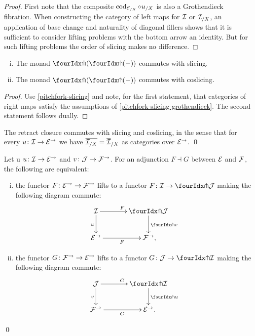 \documentclass[reqno,10pt,a4paper,oneside,draft]{amsart}
\begin{document}
{{\begin{proof}
First note that the composite $\cod_{\cal{E}_{/X}} \cc u_{/X}$ is also a Grothendieck fibration.
When constructing the category of left maps for $\cal{I}$ or $\cal{I}_{/X}$, an application of base change and naturality of diagonal fillers shows that it is sufficient to consider lifting problems with the bottom arrow an identity.
But for such lifting problems the order of slicing makes no difference.
\end{proof}



\begin{corollary} \label{pitchfork-slicing-monad}
\leavevmode
\begin{enumerate}[(i)]
\item The monad $\liftl{(\liftr{(-)})}$ commutes with slicing.
\item The monad $\liftr{(\liftl{(-)})}$ commutes with coslicing.
\end{enumerate}
\end{corollary}

\begin{proof}
Use \cref{pitchfork-slicing} and note, for the first statement, that categories of right maps satisfy the assumptions of \cref{pitchfork-slicing-grothendieck}.
The second statement follows dually.
\end{proof}

\begin{proposition}
The retract closure commutes with slicing and coslicing, in the sense that for every $u \co \cal{I} \to \catE^\to$ we have
$\overline{\cal{I}_{/X}} = \overline{\cal{I}}_{/X}$ as categories over $\catE^\to$.
\qed
\end{proposition}




\begin{proposition} \label{lift-of-adjunction}
Let u $u \co \cal{I} \to \catE^\to$ and $v \co \cal{J} \to \cal{F}^\to$.
For an adjunction $F \dashv G$ between $\cal{E}$ and $\cal{F}$, the following are equivalent:
\begin{enumerate}[(i)]
\item the functor $F \co \catE^\to \to \cal{F}^\to$ lifts to a functor $F \co \cal{I} \to \liftl{\cal{J}}$ making the following diagram commute:
\[
\xymatrix@C=1.2cm{
  \cal{I}
  \ar[r]^{F}
  \ar[d]_{u}
&
  \liftl{\cal{J}}
  \ar[d]^{\liftl{v}}
\\
  \catE^\to
  \ar[r]_-{F}
&
  \cal{F}^\to
\rlap{,}}
\]
\item the functor $G \co \cal{F}^\to \to \catE^\to$ lifts to a functor $G \co \cal{J} \to \liftr{\cal{I}}$ making the following diagram commute:
\[
\xymatrix@C=1.2cm{
  \cal{J}
    \ar[d]_{v}
\ar[r]^{G}
&
  \liftr{\cal{I}}
  \ar[d]^{\liftr{u}}
\\
  \cal{F}^\to
   \ar[r]_{G}
&
  \catE^\to
\rlap{.}  }
\]
\end{enumerate}
\qed
\end{proposition}

}}
\end{document}
